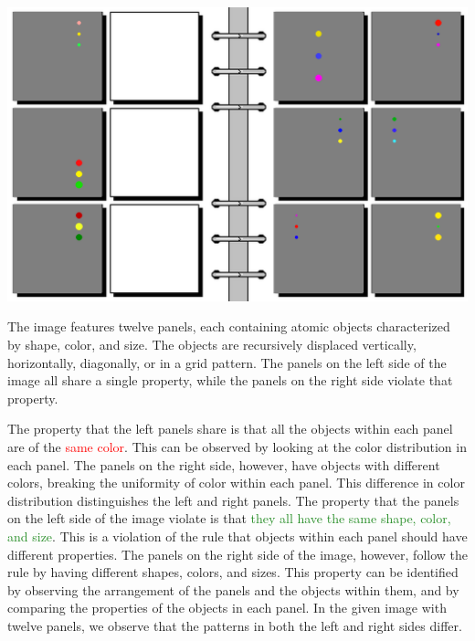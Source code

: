 \begin{tcolorbox}[breakable,enhanced jigsaw,opacityback=0,]
	\centering
	\includegraphics[width=.8\linewidth]{imgs/bongard/easy-19.png}\\
	\begin{dialogue}
		 The image features twelve panels, each containing atomic objects characterized by shape, color, and size. The objects are recursively displaced vertically, horizontally, diagonally, or in a grid pattern. The panels on the left side of the image all share a single property, while the panels on the right side violate that property.
		
		The property that the left panels share is that all the objects within each panel are of the \textcolor{red}{same color}. This can be observed by looking at the color distribution in each panel. The panels on the right side, however, have objects with different colors, breaking the uniformity of color within each panel. This difference in color distribution distinguishes the left and right panels.
		\vspace{1em}
		 The property that the panels on the left side of the image violate is that \textcolor{ForestGreen}{they all have the same shape, color, and size}. This is a violation of the rule that objects within each panel should have different properties. The panels on the right side of the image, however, follow the rule by having different shapes, colors, and sizes. This property can be identified by observing the arrangement of the panels and the objects within them, and by comparing the properties of the objects in each panel.
		\vspace{1em}
		 In the given image with twelve panels, we observe that the patterns in both the left and right sides differ.
		

\end{dialogue}
\end{tcolorbox}
